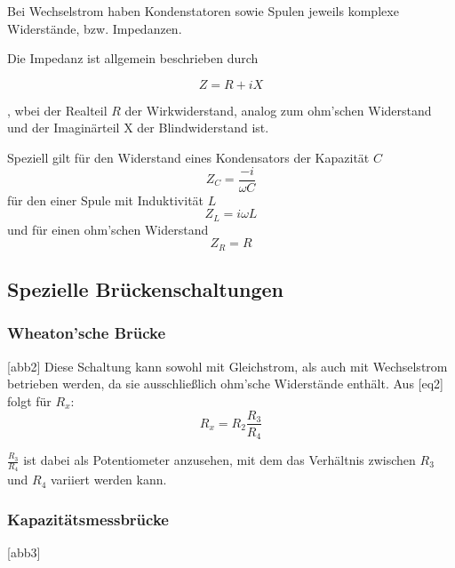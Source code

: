 Bei Wechselstrom haben Kondenstatoren sowie Spulen jeweils komplexe Widerstände, bzw. Impedanzen.

Die Impedanz ist allgemein beschrieben durch

\begin{equation}
    Z = R + iX
\end{equation}

, wbei der Realteil $R$ der Wirkwiderstand, analog zum ohm'schen Widerstand und  der Imaginärteil
X der Blindwiderstand ist. 

Speziell gilt für den Widerstand eines Kondensators der Kapazität $C$ \begin{equation}
    Z_C = \frac{-i}{\omega C}
\end{equation} für den einer Spule mit Induktivität $L$ \begin{equation}
    Z_L = i\omega L
\end{equation} und für einen ohm'schen Widerstand \begin{equation}
    Z_R = R
\end{equation}

\subsection{Spezielle Brückenschaltungen}

\subsubsection{Wheaton'sche Brücke}
[abb2]
Diese Schaltung kann sowohl mit Gleichstrom, als auch mit Wechselstrom betrieben werden, da sie ausschließlich
ohm'sche Widerstände enthält. 
Aus [eq2] folgt für $R_x$:
\begin{equation}
    R_x = R_2 \frac{R_3}{R_4}
\end{equation}

$\frac{R_3}{R_4}$ ist dabei als Potentiometer anzusehen, mit dem das Verhältnis zwischen $R_3$ und $R_4$ 
variiert werden kann. 

\subsubsection{Kapazitätsmessbrücke}
[abb3]






